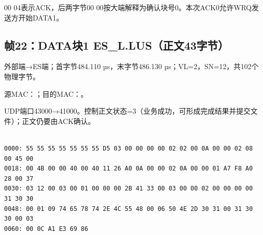 00 04表示ACK，后两字节00 00按大端解释为确认块号0。本次ACK0允许WRQ发送方开始DATA1。

\subsection*{帧22：DATA块1 ES\_L.LUS（正文43字节）}

外部端→ES端；首字节484.110 µs，末字节486.130 µs；VL=2，SN=12，共102个物理字节。

源MAC：；目的MAC：。

UDP端口43000→41000。控制正文状态=3（业务成功，可形成完成结果并提交文件）；正文仍要由ACK确认。

\par\noindent\begin{minipage}{\linewidth}
\begin{lstlisting}[caption={帧22物理字节，偏移0000--0065}]

0000: 55 55 55 55 55 55 55 D5 03 00 00 00 00 02 02 00 0A 00 00 02 08 00 45 00
0018: 00 4B 00 00 40 00 40 11 26 A0 0A 00 00 02 0A 00 00 01 A7 F8 A0 28 00 37
0030: 03 12 00 03 00 01 00 00 00 2B 41 33 00 03 00 00 02 00 00 00 00 31 30 30
0048: 00 01 09 74 65 78 74 2E 4C 55 48 00 06 50 4E 2D 30 31 00 31 30 30 00 03
0060: 00 0C A1 E3 69 86

\end{lstlisting}
\end{minipage}\par

